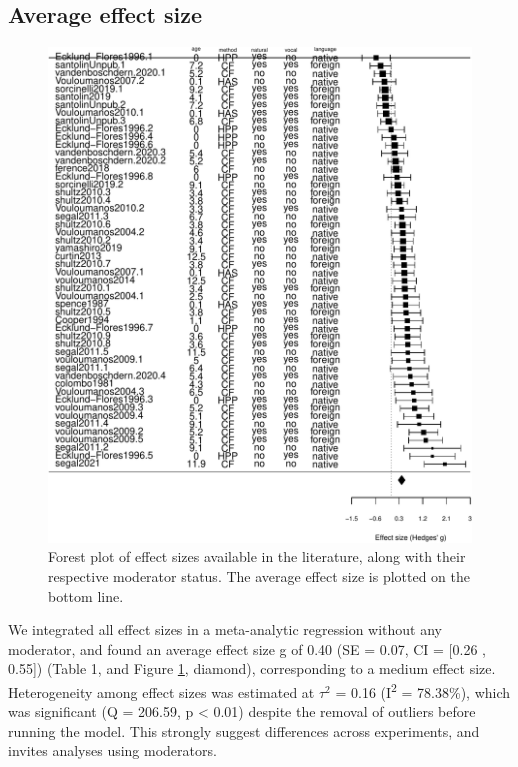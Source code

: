 \documentclass[
  english,
  man]{apa6}
\begin{document}
\hypertarget{average-effect-size}{%
\subsection{Average effect size}\label{average-effect-size}}

\begin{figure}
\centering
\includegraphics{MA_speech_pref_files/figure-latex/forest-1.pdf}
\caption{\label{fig:forest}Forest plot of effect sizes available in the literature, along with their respective moderator status. The average effect size is plotted on the bottom line.}
\end{figure}

We integrated all effect sizes in a meta-analytic regression without any moderator, and found an average effect size g of 0.40 (SE = 0.07, CI = {[}0.26 , 0.55{]}) (Table 1, and Figure \ref{fig:forest}, diamond), corresponding to a medium effect size.
Heterogeneity among effect sizes was estimated at \(\tau^2\) = 0.16 (I\textsuperscript{2} = 78.38\%), which was significant (Q = 206.59, p \textless{} 0.01) despite the removal of outliers before running the model. This strongly suggest differences across experiments, and invites analyses using moderators.
\end{document}
